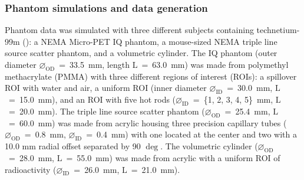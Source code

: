 \documentclass[utf8]{FrontiersinHarvard} %
\begin{document}




\subsubsection{Phantom simulations and data generation}

Phantom data was simulated with three different subjects containing technetium-99m (): a NEMA Micro-PET IQ phantom, a mouse-sized NEMA triple line source scatter phantom, and a volumetric cylinder. The IQ phantom (outer diameter $\diameter_{\mathrm{OD}}$~=~33.5~mm, length $\mathrm{L}$~=~63.0~mm) was made from polymethyl methacrylate (PMMA) with three different regions of interest (ROIs): a spillover ROI with water and air, a uniform ROI (inner diameter $\diameter_{\mathrm{ID}}$~=~30.0~mm, $\mathrm{L}$~=~15.0~mm), and an ROI with five hot rods ($\diameter_{\mathrm{ID}}$~=~\{1, 2, 3, 4, 5\}~mm, $\mathrm{L}$~=~20.0~mm). The triple line source scatter phantom ($\diameter_{\mathrm{OD}}$~=~25.4~mm, $\mathrm{L}$~=~60.0~mm) was made from acrylic housing three precision capillary tubes ($\diameter_{\mathrm{OD}}$~=~0.8~mm, $\diameter_{\mathrm{ID}}$~=~0.4~mm) with one located at the center and two with a 10.0 mm radial offset separated by 90 $\deg$. The volumetric cylinder ($\diameter_{\mathrm{OD}}$~=~28.0~mm, $\mathrm{L}$~=~55.0~mm) was made from acrylic with a uniform ROI of radioactivity ($\diameter_{\mathrm{ID}}$~=~26.0~mm, $\mathrm{L}$~=~21.0~mm). 
\end{document}

